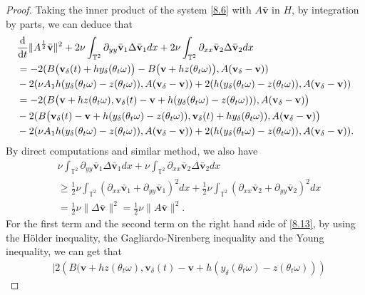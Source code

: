\documentclass{elsarticle}
\theoremstyle{definition}
\numberwithin{equation}{section}
\renewcommand{\d}{{\rm{d}}}
\begin{document}
\begin{proof}
Taking the inner product of the system   \eqref{8.6} with $A\bar{\textbf{v}}$ in $H$,  by integration by parts, we can deduce that
\begin{align}\label{8.13}
&\frac{\d}{\d t}\|A^\frac12\bar{\textbf{v}}\|^2+ 2\nu \int_{\mathbb{T}^2}\partial_{yy}\bar{\textbf{v}}_1\Delta \bar{\textbf{v}}_1dx+2\nu \int_{\mathbb{T}^2}\partial_{xx}\bar{\textbf{v}}_2\Delta \bar{\textbf{v}}_2dx\nonumber\\
&=-2(B\big( \textbf{v}_\delta(t)+hy_\delta(\theta_t\omega)\big)-B\big( \textbf{v}+hz(\theta_t\omega)\big),A(\textbf{v}_\delta-\textbf{v}))\nonumber\\
&-  2(\nu A_1h(y_\delta(\theta_t\omega)-z(\theta_t\omega)),A(\textbf{v}_\delta-\textbf{v}))
+2(h(y_\delta (\theta_t\omega)-z(\theta_t\omega)),A(\textbf{v}_\delta-\textbf{v}))\nonumber\\
&=-2(B\big(\textbf{v}+hz(\theta_t\omega),\textbf{v}_\delta(t)-\textbf{v}+h(y_\delta(\theta_t\omega)-z(\theta_t\omega)))
,A(\textbf{v}_\delta-\textbf{v})\big)\nonumber\\
&-2(B\big( \textbf{v}_\delta(t)-\textbf{v}+h(y_\delta(\theta_t\omega)-z(\theta_t\omega)),\textbf{v}_\delta(t)+hy_\delta(\theta_t\omega))
,A(\textbf{v}_\delta-\textbf{v})\big)\nonumber\\
&-  2(\nu A_1h(y_\delta(\theta_t\omega)-z(\theta_t\omega)),A(\textbf{v}_\delta-\textbf{v}))
+2(h(y_\delta (\theta_t\omega)-z(\theta_t\omega)),A(\textbf{v}_\delta-\textbf{v})).
\end{align}
By direct computations and similar method, we also have
\begin{align}\label{8.14}
&\nu \int_{\mathbb{T}^2}\partial_{yy}\bar{\textbf{v}}_1\Delta \bar{\textbf{v}}_1dx+\nu \int_{\mathbb{T}^2}\partial_{xx}\bar{\textbf{v}}_2\Delta \bar{\textbf{v}}_2dx\nonumber\\
&\geq \frac12\nu \int_{\mathbb{T}^2}(\partial_{xx}\bar{\textbf{v}}_1+\partial_{yy}\bar{\textbf{v}}_1)^2dx
+\frac12\nu \int_{\mathbb{T}^2}(\partial_{xx}\bar{\textbf{v}}_2+\partial_{yy}\bar{\textbf{v}}_2)^2dx
\nonumber\\
&=\frac12\nu\|\Delta \bar{\textbf{v}}\|^2=\frac12\nu\|A \bar{\textbf{v}}\|^2.
    \end{align}
For the first term and the second term on the right hand side of \eqref{8.13}, by using the H\"{o}lder inequality, the Gagliardo-Nirenberg inequality and the Young inequality, we can get that
\begin{align}
 &\big| 2(B\big(\textbf{v}+hz(\theta_t\omega),\textbf{v}_\delta(t)-\textbf{v}+h(y_\delta(\theta_t\omega)-z(\theta_t\omega)))

\end{align}
\end{proof}
\end{document}
